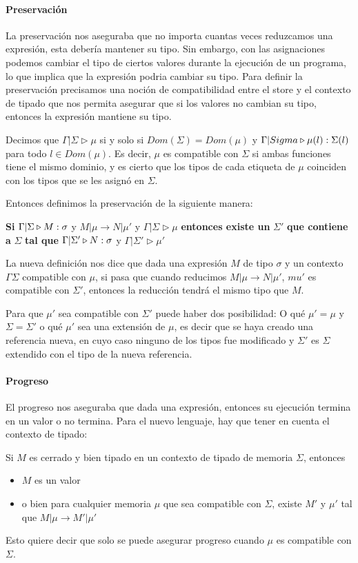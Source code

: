 \paragraph{Preservación} La preservación nos aseguraba que no importa cuantas veces reduzcamos una expresión, esta debería mantener su tipo. Sin embargo, con las asignaciones podemos cambiar el tipo de ciertos valores durante la ejecución de un programa, lo que implica que la expresión podria cambiar su tipo. Para definir la preservación precisamos una noción de compatibilidad entre el store y el contexto de tipado que nos permita asegurar que si los valores no cambian su tipo, entonces la expresión mantiene su tipo.

Decimos que $\Gamma|\Sigma\triangleright\mu$ si y solo si $Dom(\Sigma) = Dom(\mu)$ y $\Gamma|Sigma\triangleright \mu(l) : \Sigma(l)$ para todo $l\in Dom(\mu)$. Es decir, $\mu$ es compatible con $\Sigma$ si ambas funciones tiene el mismo dominio, y es cierto que los tipos de cada etiqueta de $\mu$ coinciden con los tipos que se les asignó en $\Sigma$.

Entonces definimos la preservación de la siguiente manera:
\begin{centrado}
    \textbf{Si}  $\Gamma|\Sigma\triangleright M : \sigma$ y $M|\mu\to N|\mu'$ y $\Gamma|\Sigma\triangleright\mu$ \textbf{entonces existe un} $\Sigma'$ \textbf{que contiene a} $\Sigma$\textbf{ tal que} $\Gamma|\Sigma'\triangleright N : \sigma$ y $\Gamma|\Sigma'\triangleright\mu'$
\end{centrado}

La nueva definición nos dice que dada una expresión $M$ de tipo $\sigma$ y un contexto $\Gamma\Sigma$ compatible con $\mu$, si pasa que cuando reducimos $M|\mu\to N|\mu'$, $mu'$ es compatible con $\Sigma'$, entonces la reducción tendrá el mismo tipo que $M$.

Para que $\mu'$ sea compatible con $\Sigma'$ puede haber dos posibilidad: O qué $\mu' = \mu$ y $\Sigma = \Sigma'$ o qué $\mu'$ sea una extensión de $\mu$, es decir que se haya creado una referencia nueva, en cuyo caso ninguno de los tipos fue modificado y $\Sigma'$ es $\Sigma$ extendido con el tipo de la nueva referencia.

\paragraph{Progreso} El progreso nos aseguraba que dada una expresión, entonces su ejecución termina en un valor o no termina. Para el nuevo lenguaje, hay que tener en cuenta el contexto de tipado:

\begin{centrado}
    Si $M$ es cerrado y bien tipado en un contexto de tipado de memoria $\Sigma$, entonces
    \begin{itemize}
        \item $M$ es un valor
        \item o bien para cualquier memoria $\mu$ que sea compatible con $\Sigma$, existe $M'$ y $\mu'$ tal que $M|\mu\to M'|\mu'$
    \end{itemize}
\end{centrado}

Esto quiere decir que solo se puede asegurar progreso cuando $\mu$ es compatible con $\Sigma$.
